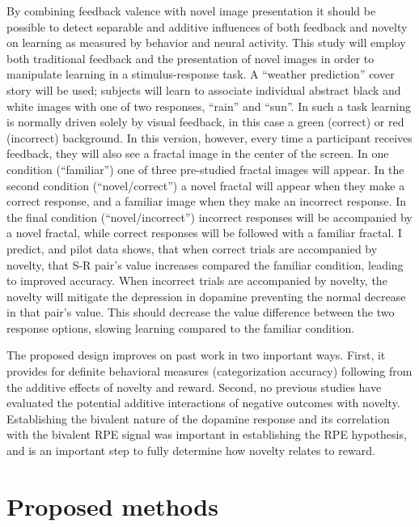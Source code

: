 \documentclass[doc]{apa}        %
\begin{document}
By combining feedback valence with novel image presentation it should be possible to detect separable and additive influences of both feedback and novelty on learning as measured by behavior and neural activity.  This study will employ both traditional feedback and the presentation of novel images in order to manipulate learning in a stimulus-response task.  A ``weather prediction'' cover story will be used;  subjects will learn to associate individual abstract black and white images with one of two responses, ``rain'' and ``sun''.  In such a task learning is normally driven solely by visual feedback, in this case a green (correct) or red (incorrect) background.   In this version, however, every time a participant receives feedback, they will also see a fractal image in the center of the screen.  In one condition (``familiar'') one of three pre-studied fractal images will appear.  In the second condition (``novel/correct'') a novel fractal will appear when they make a correct response, and a familiar image when they make an incorrect response.   In the final condition (``novel/incorrect'') incorrect responses will be accompanied by a novel fractal, while correct responses will be followed with a familiar fractal. I predict, and pilot data shows, that when correct trials are accompanied by novelty, that S-R pair's value increases compared the familiar condition, leading to improved accuracy.  When incorrect trials are accompanied by novelty, the novelty will mitigate the depression in dopamine preventing the normal decrease in that pair's value.  This should decrease the value difference between the two response options, slowing learning compared to the familiar condition. 

The proposed design improves on past work in two important ways. First, it provides for definite behavioral measures (categorization accuracy) following from the additive effects of novelty and reward.  Second, no previous studies have evaluated the potential additive interactions of negative outcomes with novelty.  Establishing the bivalent nature of the dopamine response and its correlation with the bivalent RPE signal was important in establishing the RPE hypothesis, and is an important step to fully determine how novelty relates to reward.


\section{Proposed methods} %
\label{sec:methods}
\end{document}

